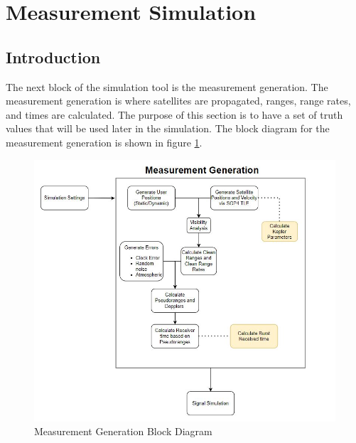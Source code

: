 \documentclass[12pt]{report}
\begin{document}
\section{Measurement Simulation}
\subsection{Introduction}
The next block of the simulation tool is the measurement generation. The measurement generation is where satellites are propagated, ranges, range rates, and times are calculated. The purpose of this section is to have a set of truth values that will be used later in the simulation. The block diagram for the measurement generation is shown in figure \ref{fig:MeasBlock}.

\begin{figure}[h]
    \centering
    \includegraphics[width=5in]{MeasurementGenBlockDiagram}
    \caption{Measurement Generation Block Diagram}
    \label{fig:MeasBlock}
\end{figure}
\end{document}
